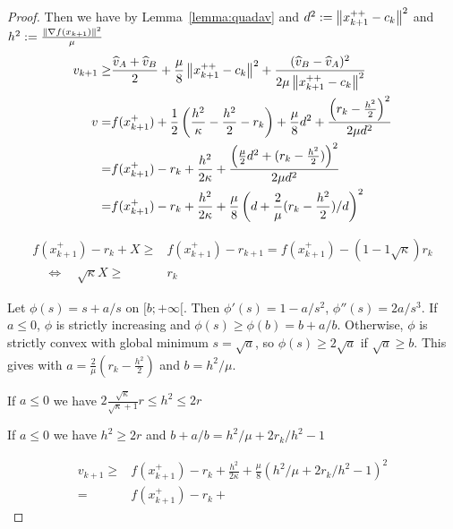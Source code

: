 \documentclass[12pt,english]{article}
\begin{document}
\begin{proof}
Then we have by Lemma~\ref{lemma:quadav} and $d^2:=\left\|x_{k+1}^{++}-c_k\right\|^2$ and $h^2:=\frac{\left\|\nabla f(x_{k+1})\right\|^2}{\mu}$
%
\begin{align*}
v_{k+1} \ge& \frac{\widehat{v}_A+\widehat{v}_B}{2}+ \frac{\mu}{8}\left\|x_{k+1}^{++}-c_k\right\|^2+\frac{(\widehat{v}_B-\widehat{v}_A)^2}{2\mu\left\|x_{k+1}^{++}-c_k\right\|^2}\\
v=& f(x_{k+1}^+) + \frac12\left(  \frac{h^2}{\kappa}- \frac{h^2}{2}   -r_k  \right) 
+ \frac{\mu}{8}d^2+\frac{\left( r_k - \frac{h^2}{2}\right)^2}{2\mu d^2}\\
=& f(x_{k+1}^+) -r_k  + \frac{h^2}{2\kappa}  
+\frac{\left( \frac{\mu}{2}d^2 +(r_k - \frac{h^2}{2}) \right)^2}{2\mu d^2}\\ 
=& f(x_{k+1}^+) -r_k  + \frac{h^2}{2\kappa}  
+\frac{\mu}{8}\left(d + \frac{2}{\mu}(r_k - \frac{h^2}{2})/d \right)^2 
\end{align*}
%

%
\begin{align*}
f(x_{k+1}^+) -r_k  + X \ge& f(x_{k+1}^+) -r_{k+1} = f(x_{k+1}^+) - (1-1\sqrt{\kappa})r_k\\
\quad\Leftrightarrow\quad 
\sqrt{\kappa} X \ge& r_k
\end{align*}
%




Let $\phi(s) = s + a/s$ on $[b;+\infty[$. 
Then $\phi'(s) = 1- a/s^2$, $\phi''(s) = 2a/s^3$. If $a\le 0$, $\phi$ is strictly increasing and $\phi(s)\ge \phi(b)=b+a/b$. Otherwise, $\phi$ is strictly convex with global minimum $s = \sqrt{a}$, so $\phi(s) \ge 2\sqrt{a}$ if $\sqrt{a}\ge b$. This gives with $a=\frac{2}{\mu}(r_k - \frac{h^2}{2})$ and $b=h^2/\mu$.

If $a\le 0$ we have $2\frac{\sqrt{\kappa}}{\sqrt{\kappa}+1} r \le h^2\le 2r$


If $a\le 0$ we have $h^2\ge 2r$ and $b+a/b = h^2/\mu + 2r_k/h^2 - 1$


\begin{align*}
v_{k+1} \ge&  
f(x_{k+1}^+) -r_k  + \frac{h^2}{2\kappa}  +\frac{\mu}{8}\left(h^2/\mu + 2r_k/h^2 - 1\right)^2\\
=& f(x_{k+1}^+) -r_k  +
\end{align*}
%


\end{proof}
\end{document}
